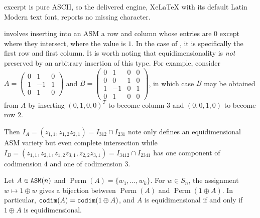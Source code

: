 \documentclass[10pt,a4paper]{amsart}
\DeclareMathOperator{\ASM}{{\tt ASM}}
\DeclareMathOperator{\Perm}{Perm}
\DeclareMathOperator{\codim}{{\tt codim}}
\begin{document}
excerpt is pure ASCII, so the delivered engine, XeLaTeX with its default Latin Modern text font, reports no missing character.
\begin{example}\label{ex:permBij}
  involves inserting into an ASM a row and column whose entries are $0$ except where they intersect, where the value is $1$. In the case of , it is specifically the first row and first column.  It is worth noting that equidimensionality is \emph{not} preserved by an arbitrary insertion of this type.  For example, consider $A = \begin{pmatrix}
0 & 1 & 0 \\
1 & -1 & 1 \\
0 & 1 &  0
\end{pmatrix}$ and $B = \begin{pmatrix}
0 & 1 & 0 & 0 \\
0 & 0 & 1 & 0 \\
1 & -1 & 0 & 1 \\
0 & 1 & 0 & 0
\end{pmatrix}$, in which case $B$ may be obtained from $A$ by inserting $(0,1,0,0)^T$ to become column $3$ and $(0,0,1,0)$ to become row $2$.

Then $I_A = (z_{1,1}, z_{1,2}z_{2,1}) = I_{312} \cap I_{231}$ note only defines an equidimensional ASM variety but even complete intersection while $I_B = (z_{1,1}, z_{2,1}, z_{1,2}z_{3,1}, z_{2,2}z_{3,1}) = I_{3412} \cap I_{2341}$ has one component of codimension $4$ and one of codimension $3$.  
\end{example}

\begin{prop}\label{prop:permBij}
Let $A \in \ASM(n)$ and $\Perm(A) =\{w_1,\ldots,w_k\}$.  For $w \in S_n$, the assignment $w \mapsto 1 \oplus w$ gives a bijection between $\Perm(A)$ and $\Perm(1 \oplus A)$.  In particular, $
\codim(A)=\codim(1 \oplus A)$, and $A$ is equidimensional if and only if $1 \oplus A$ is equidimensional.
\end{prop}
\end{document}

